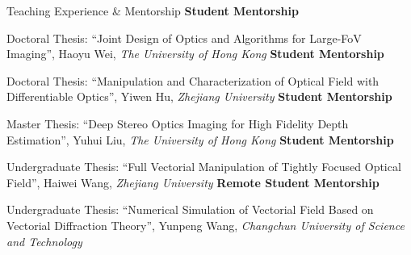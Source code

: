 \begin{rubric}{Teaching Experience \& Mentorship}
    \entry*[2022 -- 2025]%
    \textbf{Student Mentorship}
    \par Doctoral Thesis: ``Joint Design of Optics and Algorithms for Large-FoV Imaging'', Haoyu Wei, \textit{The University of Hong Kong}
    \entry*[2021 -- 2024]%
    \textbf{Student Mentorship}
    \par Doctoral Thesis: ``Manipulation and Characterization of Optical Field with Differentiable Optics'', Yiwen Hu, \textit{Zhejiang University}
    \entry*[2023]%
    \textbf{Student Mentorship}
    \par Master Thesis: ``Deep Stereo Optics Imaging for High Fidelity Depth Estimation'', Yuhui Liu, \textit{The University of Hong Kong}
    \entry*[2022]%
    \textbf{Student Mentorship}
    \par Undergraduate Thesis: ``Full Vectorial Manipulation of Tightly Focused Optical Field'', Haiwei Wang, \textit{Zhejiang University}
    \entry*[2022]%
    \textbf{Remote Student Mentorship}
    \par Undergraduate Thesis: ``Numerical Simulation of Vectorial Field Based on Vectorial Diffraction Theory'', Yunpeng Wang, \textit{Changchun University of Science and Technology}
\end{rubric}